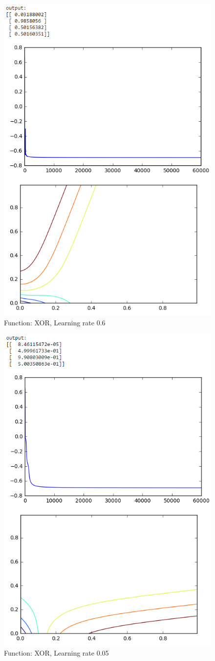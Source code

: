 \documentclass[11pt]{article}
\begin{document}
\begin{figure}[H]
	\centering
	\includegraphics[width=0.7\linewidth]{xor_lr06}
	\caption{Function: XOR, Learning rate 0.6}
	\label{fig:xorlr06}
\end{figure}
\begin{figure}[H]
	\centering
	\includegraphics[width=0.7\linewidth]{xor_lr005}
	\caption{Function: XOR, Learning rate 0.05}
	\label{fig:xorlr005}
\end{figure}
\end{document}
